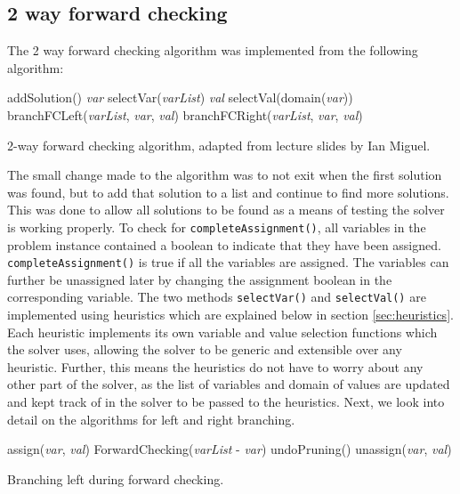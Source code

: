\documentclass{article}
\begin{document}
\subsection{2 way forward checking}
The 2 way forward checking algorithm was implemented from the following algorithm:
\begin{algorithm}[H]
\begin{algorithmic}[1]
	\State addSolution()
	\Return
\Else
	\State \textit{var} \gets selectVar(\textit{varList})
	\State \textit{val} \gets selectVal(domain(\textit{var}))
	\State branchFCLeft(\textit{varList}, \textit{var}, \textit{val})
	\State branchFCRight(\textit{varList}, \textit{var}, \textit{val})
\EndIf
\EndProcedure
\end{algorithmic}
\caption{2-way forward checking algorithm, adapted from lecture slides by Ian Miguel.}
\end{algorithm}
The small change made to the algorithm was to not exit when the first solution was found, but to add that solution to a list and continue to find more solutions. This was done to allow all solutions to be found as a means of testing the solver is working properly.
To check for \texttt{completeAssignment()}, all variables in the problem instance contained a boolean to indicate that they have been assigned. \texttt{completeAssignment()} is true if all the variables are assigned. The variables can further be unassigned later by changing the assignment boolean in the corresponding variable.  
\n
The two methods \texttt{selectVar()} and \texttt{selectVal()} are implemented using heuristics which are explained below in section \ref{sec:heuristics}. Each heuristic implements its own variable and value selection functions which the solver uses, allowing the solver to be generic and extensible over any heuristic. Further, this means the heuristics do not have to worry about any other part of the solver, as the list of variables and domain of values are updated and kept track of in the solver to be passed to the heuristics. 
\n
Next, we look into detail on the algorithms for left and right branching.
\begin{algorithm}[H]
\begin{algorithmic}[1]
\State assign(\textit{var}, \textit{val})
	\State ForwardChecking(\textit{varList} - \textit{var})
\EndIf
\State undoPruning()
\State unassign(\textit{var}, \textit{val})
\EndProcedure
\end{algorithmic}
\caption{Branching left during forward checking.}
\end{algorithm}
\end{document}
